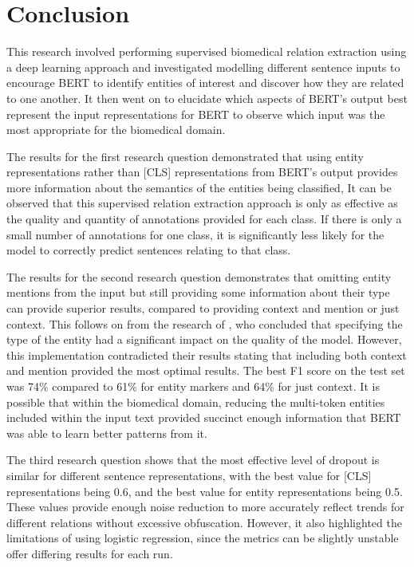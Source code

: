 \documentclass{l4proj}
\begin{document}
\chapter{Conclusion}  
This research involved performing supervised biomedical relation extraction using a deep learning approach and investigated modelling different sentence inputs to encourage BERT to identify entities of interest and discover how they are related to one another. It then went on to elucidate which aspects of BERT's output best represent the input representations for BERT to observe which input was the most appropriate for the biomedical domain.

The results for the first research question demonstrated that using entity representations rather than [CLS] representations from BERT's output provides more information about the semantics of the entities being classified, It can be observed that this supervised relation extraction approach is only as effective as the quality and quantity of annotations provided for each class. If there is only a small number of annotations for one class, it is significantly less likely for the model to correctly predict sentences relating to that class.

The results for the second research question demonstrates that omitting entity mentions from the input but still providing some information about their type can provide superior results, compared to providing context and mention or just context. This follows on from the research of \cite{mask}, who concluded that specifying the type of the entity had a significant impact on the quality of the model. However, this implementation contradicted their results stating that including both context and mention provided the most optimal results. The best F1 score on the test set was 74\% compared to 61\% for entity markers and 64\% for just context. It is possible that within the biomedical domain, reducing the multi-token entities included within the input text provided succinct enough information that BERT was able to learn better patterns from it.

The third research question shows that the most effective level of dropout is similar for different sentence representations, with the best value for [CLS] representations being 0.6, and the best value for entity representations being 0.5. These values provide enough noise reduction to more accurately reflect trends for different relations without excessive obfuscation. However, it also highlighted the limitations of using logistic regression, since the metrics can be slightly unstable offer differing results for each run.
\end{document}
